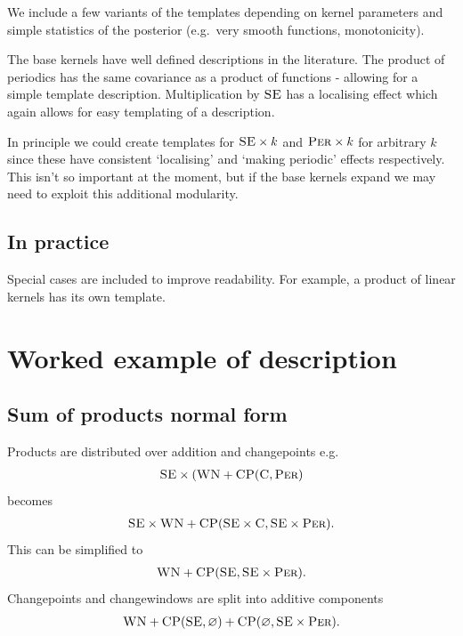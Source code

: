 \documentclass{article}
\def\eg{e.g.\ }
\let\emptyset\varnothing
\begin{document}
We include a few variants of the templates depending on kernel parameters and simple statistics of the posterior (\eg very smooth functions, monotonicity).

The base kernels have well defined descriptions in the literature.
The product of periodics has the same covariance as a product of functions - allowing for a simple template description.
Multiplication by ${\textsc{SE}}$ has a localising effect which again allows for easy templating of a description.

In principle we could create templates for $\textsc{SE} \times k$ and $\textsc{Per} \times k$ for arbitrary $k$ since these have consistent `localising' and `making periodic' effects respectively.
This isn't so important at the moment, but if the base kernels expand we may need to exploit this additional modularity.

\subsection{In practice}

Special cases are included to improve readability.
For example, a product of linear kernels has its own template.










\section{Worked example of description}

\subsection{Sum of products normal form}

Products are distributed over addition and changepoints \eg
\begin{align*}
{\textsc{SE}} \times ({\textsc{WN}} + {\textsc{CP}}({\textsc{C}}, {\textsc{Per}})
\end{align*}
becomes
\begin{align*}
{\textsc{SE}} \times {\textsc{WN}} + {\textsc{CP}}({\textsc{SE}} \times {\textsc{C}}, {\textsc{SE}} \times {\textsc{Per}}).
\end{align*}
This can be simplified to
\begin{align*}
{\textsc{WN}} + {\textsc{CP}}({\textsc{SE}}, {\textsc{SE}} \times {\textsc{Per}}).
\end{align*}
Changepoints and changewindows are split into additive components
\begin{align*}
\kWN + \kCP(\kSE, \emptyset) + \kCP(\emptyset, \kSE \times \kPer).
\end{align*}
\end{document}
